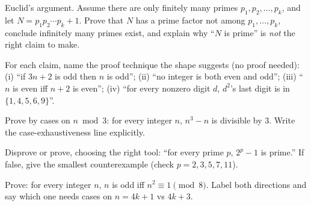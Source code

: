 \begin{exercise}[hard]
Euclid's argument. Assume there are only finitely many primes
$p_1, p_2, \dots, p_k$, and let $N = p_1 p_2 \cdots p_k + 1$. Prove that $N$
has a prime factor not among $p_1,\dots,p_k$, conclude infinitely many primes
exist, and explain why ``$N$ is prime'' is \emph{not} the right claim to make.
\end{exercise}
\begin{exercise}[easy]
For each claim, name the proof technique the shape suggests (no proof needed):
(i) ``if $3n+2$ is odd then $n$ is odd''; (ii) ``no integer is both even and
odd''; (iii) ``$n$ is even iff $n{+}2$ is even''; (iv) ``for every nonzero
digit $d$, $d^2$'s last digit is in $\{1,4,5,6,9\}$''.
\end{exercise}
\begin{exercise}[medium]
Prove by cases on $n \bmod 3$: for every integer $n$, $n^3 - n$ is divisible
by $3$. Write the case-exhaustiveness line explicitly.
\end{exercise}
\begin{exercise}[medium]
Disprove or prove, choosing the right tool: ``for every prime $p$, $2^p - 1$
is prime.'' If false, give the smallest counterexample (check
$p = 2,3,5,7,11$).
\end{exercise}
\begin{exercise}[hard]
Prove: for every integer $n$, $n$ is odd iff $n^2 \equiv 1 \pmod{8}$.
Label both directions and say which one needs cases on $n = 4k{+}1$ vs
$4k{+}3$.
\end{exercise}

